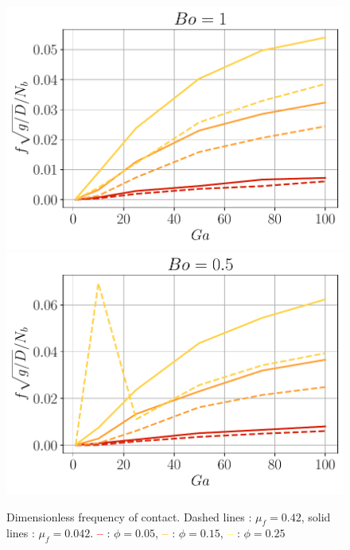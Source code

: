\begin{figure}[h!]
    \centering
    \includegraphics[height=0.20\textheight]{image/N_10/freq/HzG_Bo_1.pdf}
    \includegraphics[height=0.20\textheight]{image/N_10/freq/HzG_Bo_0_5.pdf}
    \caption{Dimensionless frequency of contact. Dashed lines : $\mu_f = 0.42$, solid lines : $\mu_f = 0.042$. \textcolor{red}{\textbf{--}} : $\phi = 0.05$, \textcolor{orange}{\textbf{--}} : $\phi = 0.15$, \textcolor{yellow}{\textbf{--}} : $\phi = 0.25$} 
    \label{fig:freq_of_c}
\end{figure} 





